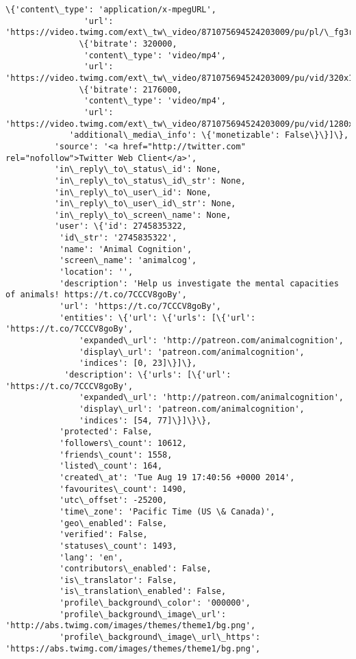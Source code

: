 \documentclass[11pt]{article}
\begin{document}
\begin{Verbatim}[commandchars=\\\{\}]
               \{'content\_type': 'application/x-mpegURL',
                'url': 'https://video.twimg.com/ext\_tw\_video/871075694524203009/pu/pl/\_fg3rzHZb9J40wJb.m3u8'\},
               \{'bitrate': 320000,
                'content\_type': 'video/mp4',
                'url': 'https://video.twimg.com/ext\_tw\_video/871075694524203009/pu/vid/320x180/PxWa9GGi0CIFtQaK.mp4'\},
               \{'bitrate': 2176000,
                'content\_type': 'video/mp4',
                'url': 'https://video.twimg.com/ext\_tw\_video/871075694524203009/pu/vid/1280x720/s9r873KfVTspe\_p1.mp4'\}]\},
             'additional\_media\_info': \{'monetizable': False\}\}]\},
          'source': '<a href="http://twitter.com" rel="nofollow">Twitter Web Client</a>',
          'in\_reply\_to\_status\_id': None,
          'in\_reply\_to\_status\_id\_str': None,
          'in\_reply\_to\_user\_id': None,
          'in\_reply\_to\_user\_id\_str': None,
          'in\_reply\_to\_screen\_name': None,
          'user': \{'id': 2745835322,
           'id\_str': '2745835322',
           'name': 'Animal Cognition',
           'screen\_name': 'animalcog',
           'location': '',
           'description': 'Help us investigate the mental capacities of animals! https://t.co/7CCCV8goBy',
           'url': 'https://t.co/7CCCV8goBy',
           'entities': \{'url': \{'urls': [\{'url': 'https://t.co/7CCCV8goBy',
               'expanded\_url': 'http://patreon.com/animalcognition',
               'display\_url': 'patreon.com/animalcognition',
               'indices': [0, 23]\}]\},
            'description': \{'urls': [\{'url': 'https://t.co/7CCCV8goBy',
               'expanded\_url': 'http://patreon.com/animalcognition',
               'display\_url': 'patreon.com/animalcognition',
               'indices': [54, 77]\}]\}\},
           'protected': False,
           'followers\_count': 10612,
           'friends\_count': 1558,
           'listed\_count': 164,
           'created\_at': 'Tue Aug 19 17:40:56 +0000 2014',
           'favourites\_count': 1490,
           'utc\_offset': -25200,
           'time\_zone': 'Pacific Time (US \& Canada)',
           'geo\_enabled': False,
           'verified': False,
           'statuses\_count': 1493,
           'lang': 'en',
           'contributors\_enabled': False,
           'is\_translator': False,
           'is\_translation\_enabled': False,
           'profile\_background\_color': '000000',
           'profile\_background\_image\_url': 'http://abs.twimg.com/images/themes/theme1/bg.png',
           'profile\_background\_image\_url\_https': 'https://abs.twimg.com/images/themes/theme1/bg.png',

\end{Verbatim}
\end{document}

